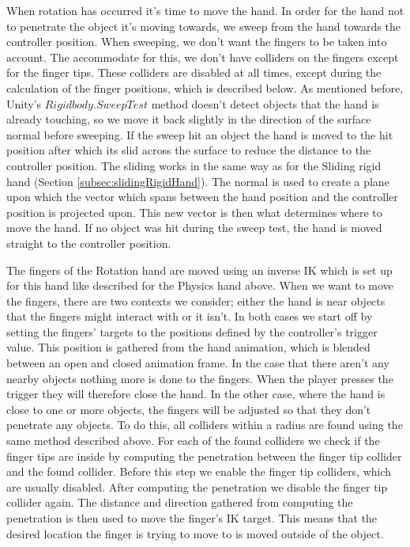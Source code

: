 When rotation has occurred it's time to move the hand. In order for the hand not to penetrate the object it's moving towards, we sweep from the hand towards the controller position. When sweeping, we don't want the fingers to be taken into account. The accommodate for this, we don't have colliders on the fingers except for the finger tips. These colliders are disabled at all times, except during the calculation of the finger positions, which is described below. As mentioned before, Unity's $Rigidbody.SweepTest$ method doesn't detect objects that the hand is already touching, so we move it back slightly in the direction of the surface normal before sweeping. If the sweep hit an object the hand is moved to the hit position after which its slid across the surface to reduce the distance to the controller position. The sliding works in the same way as for the Sliding rigid hand (Section \ref{subsec:slidingRigidHand}). The normal is used to create a plane upon which the vector which spans between the hand position and the controller position is projected upon. This new vector is then what determines where to move the hand. If no object was hit during the sweep test, the hand is moved straight to the controller position.

The fingers of the Rotation hand are moved using an inverse IK which is set up for this hand like described for the Physics hand above. When we want to move the fingers, there are two contexts we consider; either the hand is near objects that the fingers might interact with or it isn't. In both cases we start off by setting the fingers' targets to the positions defined by the controller's trigger value. This position is gathered from the hand animation, which is blended between an open and closed animation frame. In the case that there aren't any nearby objects nothing more is done to the fingers. When the player presses the trigger they will therefore close the hand. In the other case, where the hand is close to one or more objects, the fingers will be adjusted so that they don't penetrate any objects. To do this, all colliders within a radius are found using the same method described above. For each of the found colliders we check if the finger tips are inside by computing the penetration between the finger tip collider and the found collider. Before this step we enable the finger tip colliders, which are usually disabled. After computing the penetration we disable the finger tip collider again. The distance and direction gathered from computing the penetration is then used to move the finger's IK target. This means that the desired location the finger is trying to move to is moved outside of the object.

